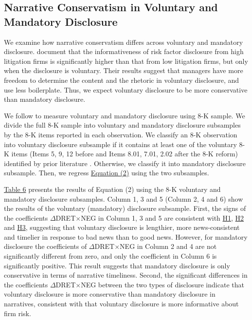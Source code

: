 \documentclass[letterpaper,12pt]{article}
\begin{document}
\begin{spacing}{1.5}
\subsection{Narrative Conservatism in Voluntary and Mandatory Disclosure}
\noindent We examine how narrative conservatism differs across voluntary and mandatory disclosure.  document that the informativeness of risk factor disclosure from high litigation firms is significantly higher than that from low litigation firms, but only when the disclosure is voluntary. Their results suggest that managers have more freedom to determine the content and the rhetoric in voluntary disclosure, and use less boilerplate. Thus, we expect voluntary disclosure to be more conservative than mandatory disclosure.

We follow  to measure voluntary and mandatory disclosure using 8-K sample. We divide the full 8-K sample into voluntary and mandatory disclosure subsamples by the 8-K items reported in each observation. We classify an 8-K observation into voluntary disclosure subsample if it contains at least one of the voluntary 8-K items (Items 5, 9, 12 before and Items 8.01, 7.01, 2.02 after the 8-K reform) identified by prior literature \cite{lermanNewForm8K2010, heMeasuringDisclosureUsing2020}. Otherwise, we classify it into mandatory disclosure subsample. Then, we regress \hyperref[eq2]{Equation (2)} using the two subsamples. 

\hyperref[T6]{Table 6} presents the results of Equation (2) using the 8-K voluntary and mandatory disclosure subsamples. Column 1, 3 and 5 (Column 2, 4 and 6) show the results of the voluntary (mandatory) disclosure subsample. First, the signs of the coefficients $\Delta$DRET$\times$NEG in Column 1, 3 and 5 are consistent with \hyperref[h1]{H1}, \hyperref[h2]{H2} and \hyperref[h3]{H3}, suggesting that voluntary disclosure is lengthier, more news-consistent and timelier in response to bad news than to good news. However, for mandatory disclosure the coefficients of $\Delta$DRET$\times$NEG in Column 2 and 4 are not significantly different from zero, and only the coefficient in Column 6 is significantly positive. This result suggests that mandatory disclosure is only conservative in terms of narrative timeliness. Second, the significant differences in the coefficients $\Delta$DRET$\times$NEG between the two types of disclosure indicate that voluntary disclosure is more conservative than mandatory disclosure in narratives, consistent with  that voluntary disclosure is more informative about firm risk.


\end{spacing}
\end{document}
